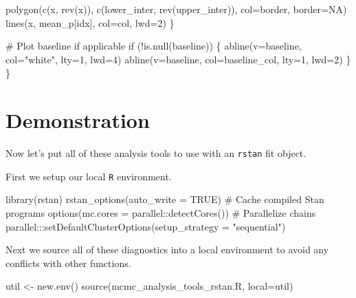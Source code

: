 \documentclass[
  letterpaper,
  DIV=11,
  numbers=noendperiod]{scrartcl}
\newenvironment{Shaded}{\begin{snugshade}}{\end{snugshade}}
\newcommand{\AttributeTok}[1]{\textcolor[rgb]{0.40,0.45,0.13}{#1}}
\newcommand{\CommentTok}[1]{\textcolor[rgb]{0.37,0.37,0.37}{#1}}
\newcommand{\ConstantTok}[1]{\textcolor[rgb]{0.56,0.35,0.01}{#1}}
\newcommand{\ControlFlowTok}[1]{\textcolor[rgb]{0.00,0.23,0.31}{#1}}
\newcommand{\DecValTok}[1]{\textcolor[rgb]{0.68,0.00,0.00}{#1}}
\newcommand{\FunctionTok}[1]{\textcolor[rgb]{0.28,0.35,0.67}{#1}}
\newcommand{\KeywordTok}[1]{\textcolor[rgb]{0.00,0.23,0.31}{#1}}
\newcommand{\NormalTok}[1]{\textcolor[rgb]{0.00,0.23,0.31}{#1}}
\newcommand{\OperatorTok}[1]{\textcolor[rgb]{0.37,0.37,0.37}{#1}}
\newcommand{\OtherTok}[1]{\textcolor[rgb]{0.00,0.23,0.31}{#1}}
\newcommand{\SpecialCharTok}[1]{\textcolor[rgb]{0.37,0.37,0.37}{#1}}
\newcommand{\StringTok}[1]{\textcolor[rgb]{0.13,0.47,0.30}{#1}}
\begin{document}
\begin{Shaded}
\begin{Highlighting}[]
\NormalTok{    polygon(c(x, rev(x)), c(lower\_inter, rev(upper\_inter)),}
\NormalTok{            col}\OperatorTok{=}\NormalTok{border, border}\OperatorTok{=}\NormalTok{NA)}
\NormalTok{    lines(x, mean\_p[idx], col}\OperatorTok{=}\NormalTok{col, lwd}\OperatorTok{=}\DecValTok{2}\NormalTok{)}
\NormalTok{  \}}

  \CommentTok{\# Plot baseline if applicable}
  \ControlFlowTok{if}\NormalTok{ (}\OperatorTok{!}\KeywordTok{is}\NormalTok{.null(baseline)) \{}
\NormalTok{    abline(v}\OperatorTok{=}\NormalTok{baseline, col}\OperatorTok{=}\StringTok{"white"}\NormalTok{, lty}\OperatorTok{=}\DecValTok{1}\NormalTok{, lwd}\OperatorTok{=}\DecValTok{4}\NormalTok{)}
\NormalTok{    abline(v}\OperatorTok{=}\NormalTok{baseline, col}\OperatorTok{=}\NormalTok{baseline\_col, lty}\OperatorTok{=}\DecValTok{1}\NormalTok{, lwd}\OperatorTok{=}\DecValTok{2}\NormalTok{)}
\NormalTok{  \}}
\NormalTok{\}}
\end{Highlighting}
\end{Shaded}

\section{Demonstration}\label{demonstration}

Now let's put all of these analysis tools to use with an \texttt{rstan}
fit object.

First we setup our local \texttt{R} environment.

\begin{Shaded}
\begin{Highlighting}[]
\FunctionTok{library}\NormalTok{(rstan)}
\FunctionTok{rstan\_options}\NormalTok{(}\AttributeTok{auto\_write =} \ConstantTok{TRUE}\NormalTok{)            }\CommentTok{\# Cache compiled Stan programs}
\FunctionTok{options}\NormalTok{(}\AttributeTok{mc.cores =}\NormalTok{ parallel}\SpecialCharTok{::}\FunctionTok{detectCores}\NormalTok{()) }\CommentTok{\# Parallelize chains}
\NormalTok{parallel}\SpecialCharTok{:::}\FunctionTok{setDefaultClusterOptions}\NormalTok{(}\AttributeTok{setup\_strategy =} \StringTok{"sequential"}\NormalTok{)}
\end{Highlighting}
\end{Shaded}

Next we source all of these diagnostics into a local environment to
avoid any conflicts with other functions.

\begin{Shaded}
\begin{Highlighting}[]
\NormalTok{util }\OtherTok{\textless{}{-}} \FunctionTok{new.env}\NormalTok{()}
\FunctionTok{source}\NormalTok{(}\StringTok{\textquotesingle{}mcmc\_analysis\_tools\_rstan.R\textquotesingle{}}\NormalTok{, }\AttributeTok{local=}\NormalTok{util)}
\end{Highlighting}
\end{Shaded}
\end{document}
